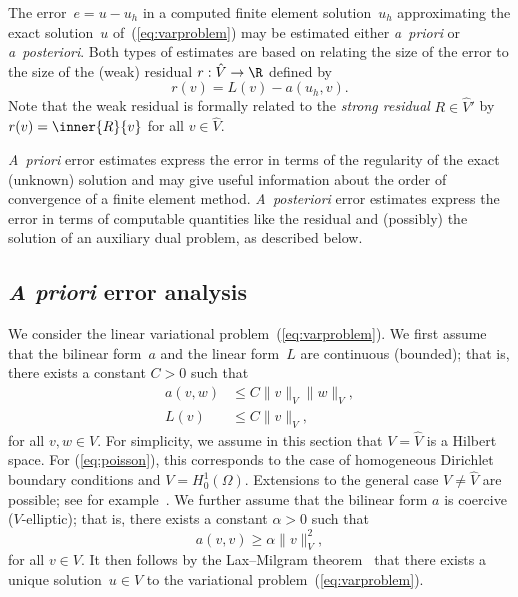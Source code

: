 The error~$e = u - u_h$ in a computed finite element solution~$u_h$
approximating the exact solution~$u$ of~(\ref{eq:varproblem}) may be
estimated either \emph{a~priori} or \emph{a~posteriori}. Both types of
estimates are based on relating the size of the error to the size of
the (weak) residual $r : \hat{V} \rightarrow \R$ defined by
\begin{equation} \label{eq:residual,weak}
  r(v) = L(v) - a(u_h, v).
\end{equation}
Note that the weak residual is formally related to the \emph{strong
  residual} $R \in \hat{V}'$ by $r(v) = \inner{R}{v}$ for all $v \in
\hat{V}$.

\emph{A~priori} error estimates express the error in terms of the
regularity of the exact (unknown) solution and may give useful
information about the order of convergence of a finite element
method. \emph{A~posteriori} error estimates express the error in terms
of computable quantities like the residual and (possibly) the solution
of an auxiliary dual problem, as described below.

\subsection{\emph{A priori} error analysis}

We consider the linear variational problem~(\ref{eq:varproblem}). We
first assume that the bilinear form~$a$ and the linear form~$L$ are
continuous (bounded); that is, there exists a constant $C > 0$ such
that
\begin{equation} \label{eq:continuity}
  \begin{split}
    a(v, w) &\leqslant C \|v\|_V \|w\|_V,
    \\
    L(v) &\leqslant C \|v\|_V,
  \end{split}
\end{equation}
for all $v, w \in V$. For simplicity, we assume in this section that
$V = \hat{V}$ is a Hilbert space. For (\ref{eq:poisson}), this
corresponds to the case of homogeneous Dirichlet boundary conditions
and $V = H^1_0(\Omega)$. Extensions to the general case $V \neq
\hat{V}$ are possible; see for example~\citet{OdenDemkowicz1996}. We
further assume that the bilinear form $a$ is coercive ($V$-elliptic);
that is, there exists a constant $\alpha > 0$ such that
\begin{equation} \label{eq:coercivity}
  a(v, v) \geqslant \alpha \|v\|_V^2,
\end{equation}
for all $v \in V$. It then follows by the Lax--Milgram
theorem~\citep{LaxMilgram1954} that there exists a unique solution~$u
\in V$ to the variational problem~(\ref{eq:varproblem}).

